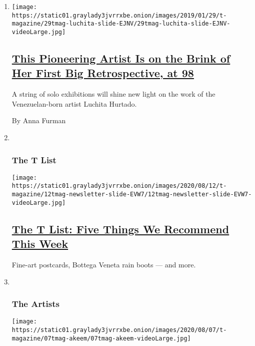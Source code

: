 \begin{enumerate}
\def\labelenumi{\arabic{enumi}.}
\item
  \texttt{[image: https://static01.graylady3jvrrxbe.onion/images/2019/01/29/t-magazine/29tmag-luchita-slide-EJNV/29tmag-luchita-slide-EJNV-videoLarge.jpg]}

  \hypertarget{this-pioneering-artist-is-on-the-brink-of-her-first-big-retrospective-at-98}{%
  \subsection{\texorpdfstring{\href{/2019/01/29/t-magazine/luchita-hurtado.html}{This
  Pioneering Artist Is on the Brink of Her First Big Retrospective, at
  98}}{This Pioneering Artist Is on the Brink of Her First Big Retrospective, at 98}}\label{this-pioneering-artist-is-on-the-brink-of-her-first-big-retrospective-at-98}}

  A string of solo exhibitions will shine new light on the work of the
  Venezuelan-born artist Luchita Hurtado.

  By Anna Furman
\item ~
  \hypertarget{the-t-list-1}{%
  \subsubsection{The T List}\label{the-t-list-1}}

  \texttt{[image: https://static01.graylady3jvrrxbe.onion/images/2020/08/12/t-magazine/12tmag-newsletter-slide-EVW7/12tmag-newsletter-slide-EVW7-videoLarge.jpg]}

  \hypertarget{the-t-list-five-things-we-recommend-this-week-1}{%
  \subsection{\texorpdfstring{\href{/2020/08/13/t-magazine/inque-postcards-rain-boots.html}{The
  T List: Five Things We Recommend This
  Week}}{The T List: Five Things We Recommend This Week}}\label{the-t-list-five-things-we-recommend-this-week-1}}

  Fine-art postcards, Bottega Veneta rain boots --- and more.
\item ~
  \hypertarget{the-artists}{%
  \subsubsection{The Artists}\label{the-artists}}

  \texttt{[image: https://static01.graylady3jvrrxbe.onion/images/2020/08/07/t-magazine/07tmag-akeem/07tmag-akeem-videoLarge.jpg]}


\end{enumerate}
